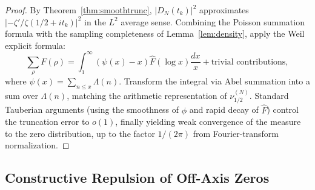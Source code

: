 \documentclass[12pt,a4paper]{amsart}
\theoremstyle{plain}
\theoremstyle{definition}
\theoremstyle{remark}
\begin{document}
\begin{proof}
By Theorem~\ref{thm:smoothtrunc}, $|D_N(t_k)|^2$ approximates $|-\zeta'/\zeta(1/2+it_k)|^2$ in the $L^2$ average sense. Combining the Poisson summation formula with the sampling completeness of Lemma~\ref{lem:density}, apply the Weil explicit formula:
\[
\sum_{\rho} F(\rho) = \int_1^\infty \left(\psi(x)-x\right)\widehat{F}(\log x)\frac{dx}{x} + \text{trivial contributions},
\]
where $\psi(x)=\sum_{n\leq x}\Lambda(n)$. Transform the integral via Abel summation into a sum over $\Lambda(n)$, matching the arithmetic representation of $\nu_{1/2}^{(N)}$. Standard Tauberian arguments (using the smoothness of $\phi$ and rapid decay of $\widehat{F}$) control the truncation error to $o(1)$, finally yielding weak convergence of the measure to the zero distribution, up to the factor $1/(2\pi)$ from Fourier-transform normalization.
\end{proof}

\subsection{Constructive Repulsion of Off-Axis Zeros}\label{sec:repulsion}
\end{document}
